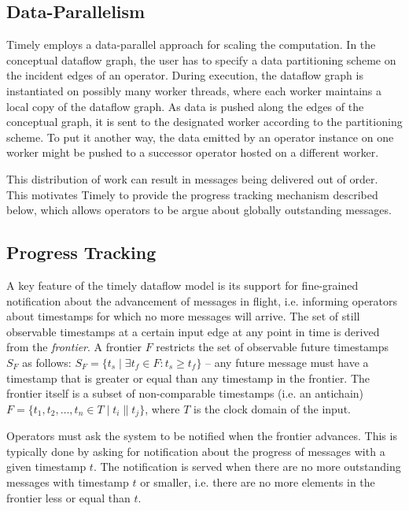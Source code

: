 \subsection{Data-Parallelism}

Timely employs a data-parallel approach for scaling the computation. In the
conceptual dataflow graph, the user has to specify a data partitioning scheme
on the incident edges of an operator. During execution, the dataflow graph
is instantiated on possibly many worker threads, where each worker maintains
a local copy of the dataflow graph. As data is pushed along the edges of the
conceptual graph, it is sent to the designated worker according to the
partitioning scheme. To put it another way, the data emitted by an operator
instance on one worker might be pushed to a successor operator
hosted on a different worker.

This distribution of work can result in messages being delivered out of
order. This motivates Timely to provide the progress tracking mechanism
described below, which allows operators to be argue about globally
outstanding messages.

\subsection{Progress Tracking}

A key feature of the timely dataflow model is its support for fine-grained notification
about the advancement of messages in flight, i.e. informing operators about
timestamps for which no more messages will arrive. The set of still observable
timestamps at a certain input edge at any point in time is derived from the \emph{frontier}.
A frontier $F$ restricts the set of observable future timestamps $S_F$ as follows:
$S_F = \{ t_s \mid \exists t_f \in F: t_s \geq t_f \}$ -- any future message must
have a timestamp that is greater or equal than any timestamp in the frontier.
The frontier itself is a subset of non-comparable timestamps (i.e. an antichain)
$F = \{t_1, t_2, \dots, t_n \in T \mid  t_i \parallel t_j \}$, where
$T$ is the clock domain of the input.

Operators must ask the system to be notified when the frontier advances. This
is typically done by asking for notification about the progress of messages with
a given timestamp $t$. The
notification is served when there are no more outstanding messages with
timestamp $t$ or smaller, i.e. there are no more elements in the frontier less
or equal than $t$.

